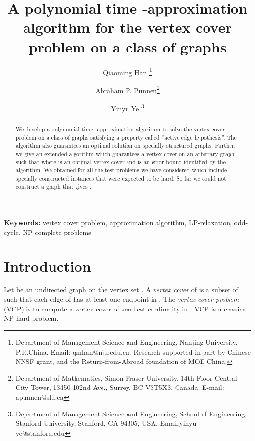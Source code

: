 \documentclass[12pt]{article}
\begin{document}
\title{A polynomial time  -approximation algorithm for the vertex cover
 problem on a class of graphs}
\author{Qiaoming Han
\thanks{Department of Management Science and
Engineering, Nanjing University, P.R.China. Email: qmhan@nju.edu.cn.
Research supported in part by Chinese NNSF grant, and the Return-from-Abroad foundation of MOE China.}  \and
Abraham P. Punnen\thanks{Department of Mathematics, Simon Fraser
University, 14th Floor Central City Tower, 13450 102nd Ave., Surrey,
BC V3T5X3, Canada. E-mail: apunnen@sfu.ca} \and Yinyu Ye
\thanks{Department of Management Science and Engineering,
School of Engineering, Stanford University, Stanford, CA 94305,
USA. Email:yinyu-ye@stanford.edu}}
\date{}
\maketitle
\begin{abstract}
We develop a polynomial time -approximation algorithm
to solve the vertex cover problem on a class of graphs satisfying
a property called ``active edge hypothesis''.
The algorithm also guarantees an
optimal solution on specially structured graphs. Further, we give
an extended algorithm which guarantees a vertex cover  on an
arbitrary graph such that  where
 is an optimal vertex cover and  is an error bound
identified by the algorithm. We obtained  for all the
test problems we have considered which include specially
constructed instances that were expected to be hard. So far we could not construct a graph that gives .
\end{abstract}
{\bf Keywords:} vertex cover problem, approximation algorithm,
LP-relaxation, odd-cycle, NP-complete problems
\par

\newpage
\section{Introduction}
Let  be an undirected graph on the vertex set
. A {\it vertex cover} of  is  a subset 
of  such that each edge of  has at least one endpoint in .
The {\it vertex cover problem} (VCP) is to compute a vertex cover of
smallest
cardinality in . VCP is a classical NP-hard problem.

\vskip 5pt
\end{document}
